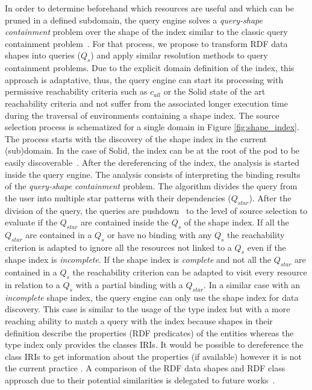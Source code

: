 In order to determine beforehand which resources are useful and which can be pruned in a defined subdomain, the query engine solves a \emph{query-shape containment} problem over the shape of the index similar to the classic query containment problem~\cite{afariQCE, Spasi2023}.
For that process, we propose to transform RDF data shapes into queries ($Q_{s}$) \cite{labragayo2017validating, Corman2019, Delva2021} and apply similar resolution methods to query containment problems.
Due to the explicit domain definition of the index, this approach is adaptative, 
thus, the query engine can start its processing with permissive reachability criteria
such as $c_{all}$ \cite{Hartig2012} or the Solid state of the art reachability criteria \cite{Taelman2023}
and not suffer from the associated longer execution time during the traversal of environments containing a shape index.
The source selection process is schematized for a single domain in Figure \ref{fig:shape_index}.
The process starts with the discovery of the shape index in the current (sub)domain.
In the case of Solid, the index can be at the root of the pod to be easily discoverable~.
After the dereferencing of the index, the analysis is started inside the query engine.
The analysis consists of interpreting the binding results of the \emph{query-shape containment} problem.
The algorithm divides the query from the user into multiple star patterns with their dependencies ($Q_{star}$).
After the division of the query, the queries are pushdown~\cite{Stuckenschmidt2004, Yang2021FlexPushdownDBHP} to the level of source selection to evaluate if the $Q_{star}$ are contained inside the $Q_s$ of the shape index.
If all the $Q_{star}$ are contained in a $Q_{s}$ or have no binding with any $Q_{s}$
the reachability criterion is adapted to ignore all the resources not linked to a $Q_{s}$ even if the shape index is \emph{incomplete}.
If the shape index is \emph{complete} and not all the $Q_{star}$ are contained in a $Q_{s}$ the reachability criterion can be adapted
to visit every resource in relation to a $Q_{s}$ with a partial binding with a $Q_{star}$.
In a similar case with an \emph{incomplete} shape index, the query engine can only use the shape index for data discovery.
This case is similar to the usage of the type index but with a more reaching ability to match a query with the index  because shapes in their definition describe the properties (RDF predicates) of the entities whereas the type index only provides the classes IRIs.
It would be possible to dereference the class IRIs to get information about the properties (if available) however it is not the current practice \cite{Taelman2023}.
A comparison of the RDF data shapes and RDF class approach due to their potential similarities is delegated to future works~.

